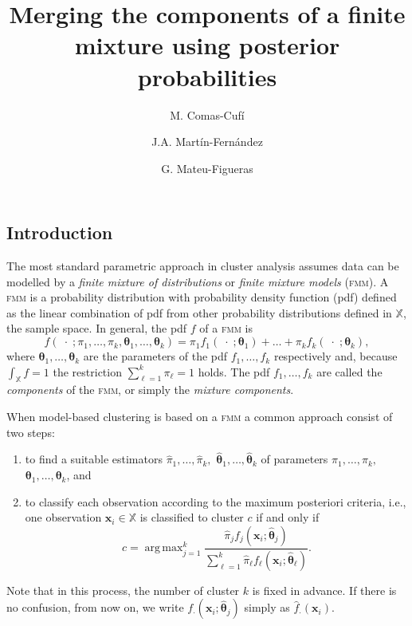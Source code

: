 \documentclass[10pt, a4paper]{article}
\title{Merging the components of a finite mixture using  posterior probabilities}
\author{M. Comas-Cufí \and J.A. Martín-Fernández \and G. Mateu-Figueras}
\DeclareMathOperator*{\argmax}{arg\,max}
\newcommand{\m}[1]{\boldsymbol{#1}}
\newcommand{\fmm}{\textsc{fmm}\xspace}
\begin{document}
\begin{spacing}{1.9}


\maketitle

\section{Introduction}

The most standard parametric approach in cluster analysis assumes data can be modelled by a \emph{finite mixture of distributions} or \emph{finite mixture models} (\fmm). A \fmm is a probability distribution with probability density function (pdf) defined as the linear combination of pdf from other probability distributions defined in $\mathbb{X}$, the sample space. In general, the pdf $f$ of a \fmm is
\begin{equation}\label{mixt}
f(\;\cdot\; ; \pi_1, \dots, \pi_k, \m\theta_1, \dots, \m\theta_k) = \pi_1 f_1(\;\cdot\; ; \m\theta_1) + \dots + \pi_k f_k(\;\cdot\; ; \m\theta_k),
\end{equation}
where $\m\theta_1, \dots,  \m\theta_k$ are the parameters of the pdf $f_1, \dots, f_k$ respectively and, because $\int_{\mathbb{X}}f = 1$ the restriction $\sum_{\ell = 1}^k \pi_\ell = 1$ holds. The pdf $f_1, \dots, f_k$ are called the \emph{components} of the \fmm, or simply the \emph{mixture components}.


When model-based clustering is based on a \fmm a common approach consist of two steps:
\begin{enumerate}
\item to find a suitable estimators $\hat{\pi}_1, \dots, \hat{\pi}_k,$ $\hat{\m\theta}_1, \dots, \hat{\m\theta}_k$ of parameters $\pi_1, \dots, \pi_k,$ $\m\theta_1, \dots, \m\theta_k$, and
\item to classify each observation according to the maximum posteriori criteria, i.e., one observation $\m x_i \in \mathbb{X}$ is classified to cluster $c$ if and only if
\[
c=\argmax_{j=1}^k \frac{ \hat{\pi}_j f_j(\m x_i ; \hat{\m\theta}_j) }{\sum_{\ell=1}^k \hat{\pi}_\ell f_\ell(\m x_i ; \hat{\m\theta}_\ell) }.
\]
\end{enumerate}
Note that in this process, the number of cluster $k$ is fixed in advance. If there is no confusion, from now on, we write $f_\cdot(\m x_i ; \hat{\m\theta}_j)$ simply as $\hat{f}_\cdot(\m x_i)$.


\end{spacing}
\end{document}
